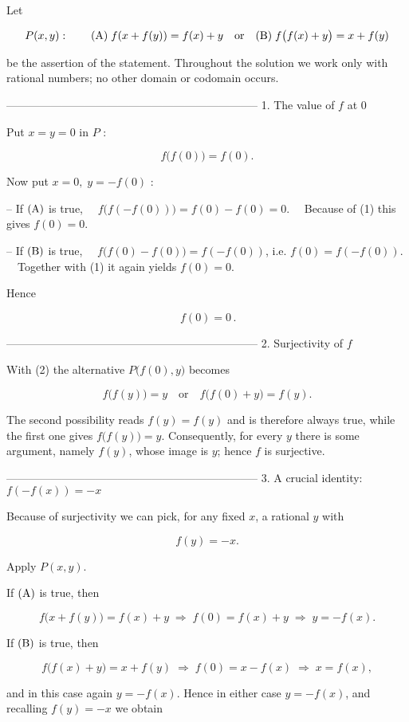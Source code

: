 Let  

\[
P(x,y):\qquad  
(\text A)\;f(x+f(y))=f(x)+y\quad\text{or}\quad  
(\text B)\;f\bigl(f(x)+y\bigr)=x+f(y)
\]

be the assertion of the statement.  
Throughout the solution we work only with rational numbers; no other
domain or codomain occurs.

--------------------------------------------------------------------
1.  The value of $f$ at $0$

Put $x=y=0$ in $P$ :

\[
f\bigl(f(0)\bigr)=f(0).\tag{1}
\]

Now put $x=0,\;y=-f(0)$ :

– If $(\text A)$ is true,  
 $f\bigl(f(-f(0))\bigr)=f(0)-f(0)=0$.  
 Because of (1) this gives $f(0)=0$.

– If $(\text B)$ is true,  
 $f\bigl(f(0)-f(0)\bigr)=f(-f(0))$, i.e. $f(0)=f(-f(0))$.  
 Together with (1) it again yields $f(0)=0$.

Hence  

\[
\boxed{\,f(0)=0\,}. \tag{2}
\]

--------------------------------------------------------------------
2.  Surjectivity of $f$

With (2) the alternative $P\bigl(f(0),y\bigr)$ becomes

\[
f\bigl(f(y)\bigr)=y\quad\text{or}\quad f\bigl(f(0)+y\bigr)=f(y).
\]

The second possibility reads $f(y)=f(y)$ and is therefore always true,
while the first one gives $f\bigl(f(y)\bigr)=y$.  
Consequently, for every $y$ there is some argument, namely $f(y)$,
whose image is $y$; hence $f$ is surjective.

--------------------------------------------------------------------
3.  A crucial identity:  $f(-f(x))=-x$

Because of surjectivity we can pick, for any fixed $x$, a rational
$y$ with  

\[
f(y)=-x.
\]

Apply $P(x,y)$.

If $(\text A)$ is true, then

\[
f\bigl(x+f(y)\bigr)=f(x)+y\;\Longrightarrow\;
f(0)=f(x)+y\;\Longrightarrow\;y=-f(x).
\]

If $(\text B)$ is true, then

\[
f\bigl(f(x)+y\bigr)=x+f(y)\;\Longrightarrow\;
f(0)=x-f(x)\;\Longrightarrow\;x=f(x),
\]

and in this case again $y=-f(x)$.  
Hence in either case $y=-f(x)$, and recalling $f(y)=-x$ we obtain  

